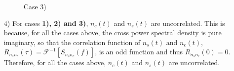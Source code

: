 \documentclass{assignment}
\begin{document}
\begin{sol}
\begin{itemize}
\begin{figure}[h]
            \caption{Case 3)}
        \end{figure}
        \item[4)] For cases \textbf{1), 2) and 3)}, $n_c(t)$ and $n_s(t)$ are uncorrelated. This is because, for all the cases above, the cross power spectral density is pure imaginary, so that the correlation function of $n_s(t)$ and $n_c(t)$, $R_{n_sn_c}(\tau)=\mathscr{F}^{-1}[S_{n_sn_c}(f)]$, is an odd function and thus $R_{n_sn_c}(0)=0$. Therefore, for all the cases above, $n_c(t)$ and $n_s(t)$ are uncorrelated.
    \end{itemize}
\end{sol}
\end{document}
